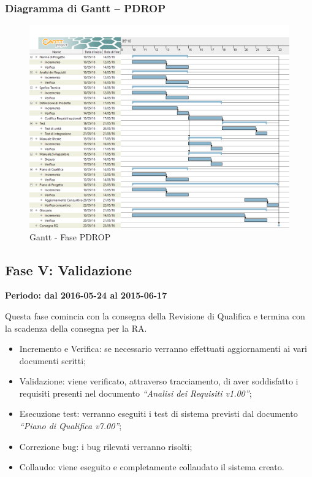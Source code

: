 \documentclass[../PianoProgetto.tex]{subfiles}
\begin{document}
		\subsubsection{Diagramma di Gantt – PDROP}
			\begin{figure}[!h]
				\centering
				\includegraphics[width=\textwidth]{gantt_png/6-requisiti_facoltativi}
				\caption{Gantt - Fase PDROP}
				\label{fig:Gantt - Fase PDROP}
			\end{figure}
			
\newpage
	\subsection{Fase V: Validazione}
		\textbf{Periodo: dal 2016-05-24 al 2015-06-17}
		
		Questa fase comincia con la consegna della Revisione di Qualifica e termina con la scadenza della consegna per la RA.

		\begin{itemize}
				\item Incremento e Verifica: se necessario verranno effettuati aggiornamenti ai vari documenti scritti;

				\item Validazione: viene verificato, attraverso tracciamento, di aver soddisfatto i requisiti presenti nel documento \textit{“Analisi dei Requisiti v1.00”};

				\item Esecuzione test: verranno eseguiti i test di sistema previsti dal documento \textit{“Piano di Qualifica v7.00”};

				\item Correzione bug: i bug rilevati verranno risolti;

				\item Collaudo: viene eseguito e completamente collaudato il sistema creato.
		\end{itemize}
		
\end{document}
